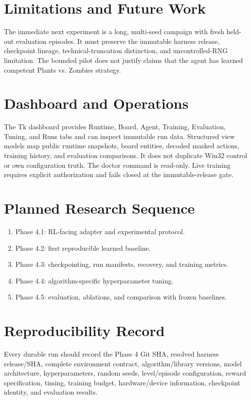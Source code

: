 \documentclass[11pt,a4paper]{article}
\begin{document}
\section{Limitations and Future Work}
The immediate next experiment is a long, multi-seed campaign with fresh held-out
evaluation episodes. It must preserve the immutable harness release, checkpoint
lineage, technical-truncation distinction, and uncontrolled-RNG limitation.
The bounded pilot does not justify claims that the agent has learned competent
Plants vs. Zombies strategy.

\section{Dashboard and Operations}
The Tk dashboard provides Runtime, Board, Agent, Training, Evaluation, Tuning,
and Runs tabs and can inspect immutable run data. Structured view models map
public runtime snapshots, board entities, decoded masked actions, training
history, and evaluation comparisons. It does not duplicate Win32 control or
own configuration truth. The doctor command is read-only. Live training
requires explicit authorization and fails closed at the immutable-release gate.

\section{Planned Research Sequence}
\begin{enumerate}
\item Phase 4.1: RL-facing adapter and experimental protocol.
\item Phase 4.2: first reproducible learned baseline.
\item Phase 4.3: checkpointing, run manifests, recovery, and training metrics.
\item Phase 4.4: algorithm-specific hyperparameter tuning.
\item Phase 4.5: evaluation, ablations, and comparison with frozen baselines.
\end{enumerate}

\section{Reproducibility Record}
Every durable run should record the Phase 4 Git SHA, resolved harness release/SHA, complete environment contract, algorithm/library versions, model architecture, hyperparameters, random seeds, level/episode configuration, reward specification, timing, training budget, hardware/device information, checkpoint identity, and evaluation results.
\end{document}
